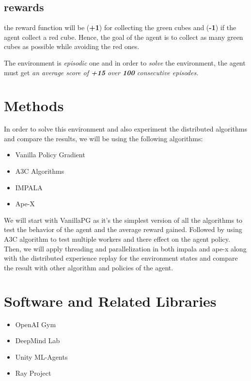 \subsection{rewards}

the reward function will be (\textbf{+1}) for collecting the green cubes and (\textbf{-1}) if the agent collect a red cube.
Hence, the goal of the agent is to collect as many green cubes as possible while avoiding the red ones.

The environment is \textit{episodic} one and in order to \textit{solve} the environment, the agent must get \textit{an average score of \textbf{+15} over \textbf{100} consecutive episodes.}

\clearpage

\section{Methods}
In order to solve this environment and also experiment the distributed algorithms and compare the results, we will be using the following algorithms:

\begin{itemize}
    \item Vanilla Policy Gradient
    \item A3C Algorithms
    \item IMPALA
    \item Ape-X 
\end{itemize}

We will start with VanillaPG as it's the simplest version of all the algorithms to test the behavior of the agent and the average reward gained. Followed by using A3C algorithm to test multiple workers and there effect on the agent policy. Then, we will apply threading and parallelization in both impala and ape-x along with the distributed experience replay for the environment states and compare the result with other algorithm and policies of the agent.

\section{Software and Related Libraries}

\begin{itemize}
    \item OpenAI Gym
    \item DeepMind Lab
    \item Unity ML-Agents
    \item Ray Project
\end{itemize}

